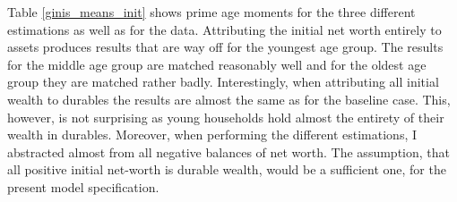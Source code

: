 \documentclass[a4paper,12pt,legno]{article}
\begin{document}
Table \ref{ginis_means_init} shows prime age moments for the three different estimations as well as for the data. Attributing the initial net worth entirely to assets produces results that are way off for the youngest age group. The results for the middle age group are matched reasonably well and for the oldest age group they are matched rather badly. Interestingly, when attributing all initial wealth to durables the results are almost the same as for the baseline case. This, however, is not surprising as young households hold almost the entirety of their wealth in durables. Moreover, when performing the different estimations, I abstracted almost from all negative balances of net worth. 
The assumption, that all positive initial net-worth is durable wealth, would be a sufficient one, for the present model specification. 
\end{document}
